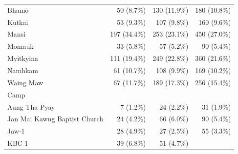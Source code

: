 \documentclass{article}
\begin{document}
\begin{table}[!h]
\begin{tabular}{llll}
\multicolumn{1}{l}{\hspace{1em}Bhamo} &
  \multicolumn{1}{r}{50 (8.7\%)} &
  \multicolumn{1}{r}{130 (11.9\%)} &
  \multicolumn{1}{r}{180 (10.8\%)} \\
\multicolumn{1}{l}{\hspace{1em}Kutkai} &
  \multicolumn{1}{r}{53 (9.3\%)} &
  \multicolumn{1}{r}{107 (9.8\%)} &
  \multicolumn{1}{r}{160 (9.6\%)} \\
\multicolumn{1}{l}{\hspace{1em}Mansi} &
  \multicolumn{1}{r}{197 (34.4\%)} &
  \multicolumn{1}{r}{253 (23.1\%)} &
  \multicolumn{1}{r}{450 (27.0\%)} \\
\multicolumn{1}{l}{\hspace{1em}Momauk} &
  \multicolumn{1}{r}{33 (5.8\%)} &
  \multicolumn{1}{r}{57 (5.2\%)} &
  \multicolumn{1}{r}{90 (5.4\%)} \\
\multicolumn{1}{l}{\hspace{1em}Myitkyina} &
  \multicolumn{1}{r}{111 (19.4\%)} &
  \multicolumn{1}{r}{249 (22.8\%)} &
  \multicolumn{1}{r}{360 (21.6\%)} \\
\multicolumn{1}{l}{\hspace{1em}Namhkam} &
  \multicolumn{1}{r}{61 (10.7\%)} &
  \multicolumn{1}{r}{108 (9.9\%)} &
  \multicolumn{1}{r}{169 (10.2\%)} \\
\multicolumn{1}{l}{\hspace{1em}Waing Maw} &
  \multicolumn{1}{r}{67 (11.7\%)} &
  \multicolumn{1}{r}{189 (17.3\%)} &
  \multicolumn{1}{r}{256 (15.4\%)} \\
\multicolumn{1}{l}{Camp} &
  \multicolumn{1}{r}{} &
  \multicolumn{1}{r}{} &
  \multicolumn{1}{r}{} \\
\multicolumn{1}{l}{\hspace{1em}Aung Tha Pyay} &
  \multicolumn{1}{r}{7 (1.2\%)} &
  \multicolumn{1}{r}{24 (2.2\%)} &
  \multicolumn{1}{r}{31 (1.9\%)} \\
\multicolumn{1}{l}{\hspace{1em}Jan Mai Kawng Baptist Church} &
  \multicolumn{1}{r}{24 (4.2\%)} &
  \multicolumn{1}{r}{66 (6.0\%)} &
  \multicolumn{1}{r}{90 (5.4\%)} \\
\multicolumn{1}{l}{\hspace{1em}Jaw-1} &
  \multicolumn{1}{r}{28 (4.9\%)} &
  \multicolumn{1}{r}{27 (2.5\%)} &
  \multicolumn{1}{r}{55 (3.3\%)} \\
\multicolumn{1}{l}{\hspace{1em}KBC-1} &
  \multicolumn{1}{r}{39 (6.8\%)} &
  \multicolumn{1}{r}{51 (4.7\%)} &

\end{tabular}
\end{table}
\end{document}

